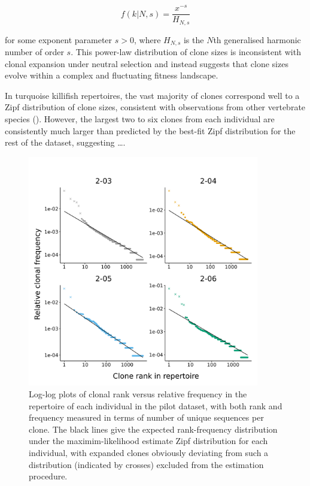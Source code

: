 \begin{equation}
f(k | N, s) = \frac{x^{-s}}{H_{N,s}}
\end{equation}

\noindent for some exponent parameter $s > 0$, where $H_{N,s}$ is the $N$th generalised harmonic number of order $s$. This power-law distribution of clone sizes is inconsistent with clonal expansion under neutral selection and instead suggests that clone sizes evolve within a complex and fluctuating fitness landscape. %

In turquoise killifish repertoires, the vast majority of clones correspond well to a Zipf distribution of clone sizes, consistent with observations from other vertebrate species (). %
However, the largest two to six clones from each individual are consistently much larger than predicted by the best-fit Zipf distribution for the rest of the dataset, suggesting \dots. %

\begin{figure}
\centering
\includegraphics[width=0.9\textwidth]{_Figures/png/pilot-clones-zipf}
\caption{Log-log plots of clonal rank versus relative frequency in the repertoire of each individual in the pilot dataset, with both rank and frequency measured in terms of number of unique sequences per clone. The black lines give the expected rank-frequency distribution under the maximim-likelihood estimate Zipf distribution for each individual, with expanded clones obviously deviating from such a distribution (indicated by crosses) excluded from the estimation procedure.}
\label{fig:igseq-pilot-clones-zipf}
\end{figure} %

